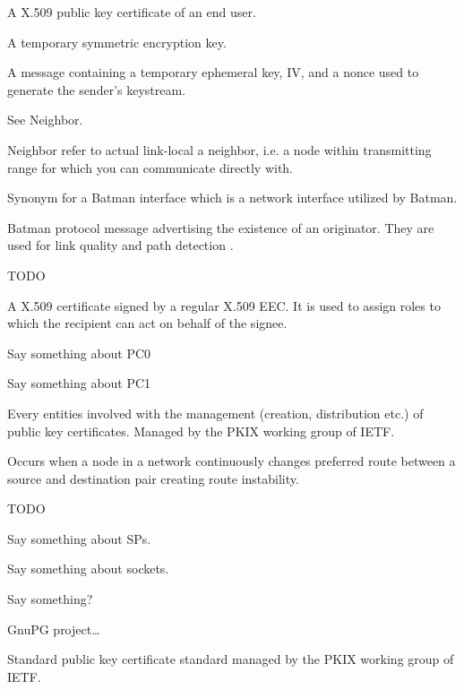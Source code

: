 \begin{acronym}
	A X.509 public key certificate of an end user.
	
	A temporary symmetric encryption key. 

	A message containing a temporary ephemeral key, IV, and a nonce used to
	generate the sender's keystream.

	See Neighbor.


	Neighbor refer to actual link-local a neighbor, i.e. a node within
	transmitting range for which you can communicate directly with.

	Synonym for a Batman interface which is a network interface utilized by
	Batman.

	Batman protocol message advertising the existence of an originator. They are
	used for link quality and path detection \cite{batman_rfc}. %


	TODO

	A X.509 certificate signed by a regular X.509 EEC. It is used to assign roles
	to which the recipient can act on behalf of the signee.

	Say something about PC0
	
	Say something about PC1
	
	
	Every entities involved with the management (creation, distribution etc.) of
	public key certificates. Managed by the PKIX working group of IETF.


	Occurs when a node in a network continuously changes preferred route between a
	source and destination pair creating route instability.


	TODO

	Say something about SPs.


	Say something about sockets.

	Say something?

	GnuPG project\ldots

	Standard public key certificate standard managed by the PKIX working group of
	IETF.

\end{acronym}
